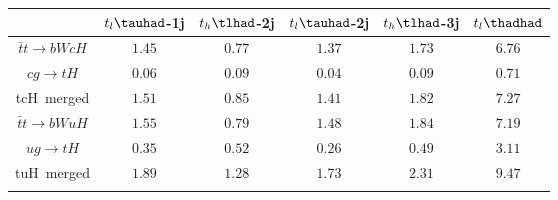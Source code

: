 \centering
\begin{tabular}{cccccc} \toprule\toprule
 & $t_{l}\tauhad$-1j & $t_{h}\tlhad$-2j & $t_{l}\tauhad$-2j & $t_{h}\tlhad$-3j & $t_{l}\thadhad$\\\midrule
$\bar{t}t\to bWcH$ & $1.45$ & $0.77$ & $1.37$ & $1.73$ & $6.76$\\
$cg\to tH$ & $0.06$ & $0.09$ & $0.04$ & $0.09$ & $0.71$\\
tcH~merged & $1.51$ & $0.85$ & $1.41$ & $1.82$ & $7.27$\\
$\bar{t}t\to bWuH$ & $1.55$ & $0.79$ & $1.48$ & $1.84$ & $7.19$\\
$ug\to tH$ & $0.35$ & $0.52$ & $0.26$ & $0.49$ & $3.11$\\
tuH~merged & $1.89$ & $1.28$ & $1.73$ & $2.31$ & $9.47$\\
\bottomrule\bottomrule\\
\end{tabular}
